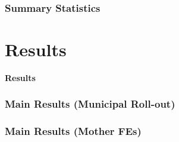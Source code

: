 \documentclass[10pt,letterpaper,subeqn,table]{beamer}
\begin{document}
\begin{frame}
\frametitle{Summary Statistics}

\begin{table}[htpb!]
  \begin{center}
    \caption{Summary Statistics: Birth and Chile Crece Contigo Data}
    \label{tab:sumstats}
  \end{center}
\end{table}
\end{frame}
%


\section{Results}
\begin{frame}
\begin{center}
  \textbf{Results}
\end{center}
\end{frame}

\begin{frame}
\frametitle{Main Results (Municipal Roll-out)}
  
\end{frame}

\begin{frame}
\frametitle{Main Results (Mother FEs)}

\end{frame}
\end{document}
